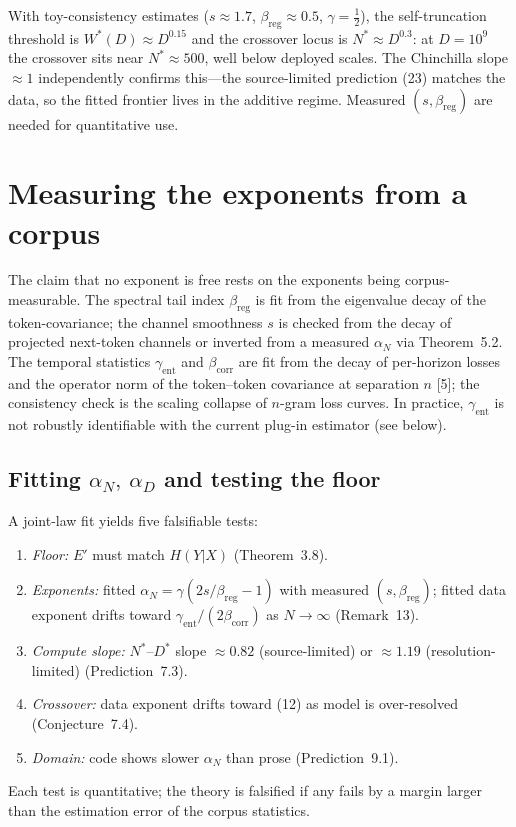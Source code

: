 \documentclass[12pt]{article}
\theoremstyle{remark}
\begin{document}
With toy-consistency estimates ($s\!\approx\!1.7$,
$\beta_{\mathrm{reg}}\!\approx\!0.5$, $\gamma\!=\!\tfrac12$), the self-truncation
threshold is $W^*(D)\!\approx\!D^{0.15}$ and the crossover locus is
$N^*\!\approx\!D^{0.3}$: at $D=10^9$ the crossover sits near $N^*\!\approx\!500$,
well below deployed scales.  The Chinchilla slope $\approx\!1$ independently
confirms this---the source-limited prediction (23) matches the
data, so the fitted frontier lives in the additive regime.  Measured
$(s,\beta_{\mathrm{reg}})$ are needed for quantitative use.

\section{Measuring the exponents from a corpus}
\label{sec:measurement}

The claim that no exponent is free rests on the exponents being
corpus-measurable. The spectral tail index $\beta_{\mathrm{reg}}$ is fit from the
eigenvalue decay of the token-covariance; the channel smoothness $s$ is checked
from the decay of projected next-token channels or inverted from a measured
$\alpha_N$ via Theorem~5.2. The temporal statistics $\gamma_{\mathrm{ent}}$
and $\beta_{\mathrm{corr}}$ are fit from the decay of per-horizon losses and the
operator norm of the token--token covariance at separation $n$
[5]; the consistency check is the scaling collapse of
$n$-gram loss curves. In practice, $\gamma_{\mathrm{ent}}$ is not robustly
identifiable with the current plug-in estimator (see below).

\subsection{Fitting $\alpha_N,\ \alpha_D$ and testing the floor}
A joint-law fit yields five falsifiable tests:
\begin{enumerate}[label=\textbf{(\arabic*)}]
\item \emph{Floor:} $E'$ must match $H(Y|X)$ (Theorem~3.8).
\item \emph{Exponents:} fitted $\alpha_N=\gamma(2s/\beta_{\mathrm{reg}}-1)$ with
  measured $(s,\beta_{\mathrm{reg}})$; fitted data exponent drifts toward
  $\gamma_{\mathrm{ent}}/(2\beta_{\mathrm{corr}})$ as $N\!\to\!\infty$
  (Remark~13).
\item \emph{Compute slope:} $N^*$--$D^*$ slope $\approx0.82$
  (source-limited) or $\approx1.19$ (resolution-limited)
  (Prediction~7.3).
\item \emph{Crossover:} data exponent drifts toward (12) as
  model is over-resolved (Conjecture~7.4).
\item \emph{Domain:} code shows slower $\alpha_N$ than prose
  (Prediction~9.1).
\end{enumerate}
Each test is quantitative; the theory is falsified if any fails by a
margin larger than the estimation error of the corpus statistics.
\end{document}
